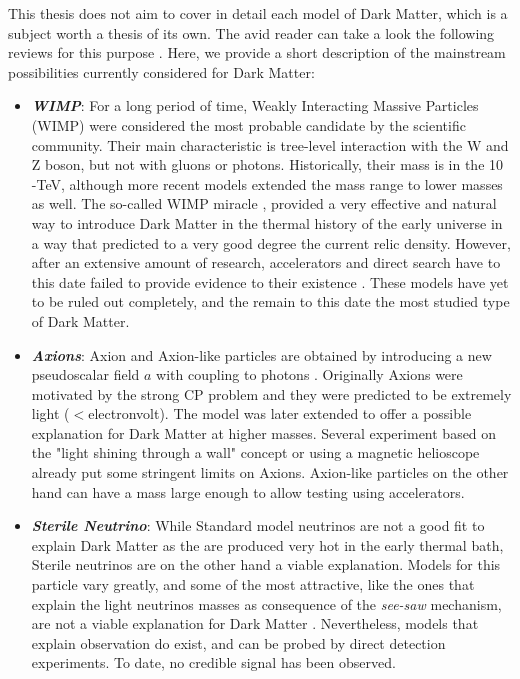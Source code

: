 This thesis does not aim to cover in detail each model of Dark Matter, which is a subject worth a thesis of its own. The avid reader can take a look the following reviews for this purpose \cite{battaglieri2017cosmic,Profumo:2019ujg,HAMBYE2020135553,alex2016dark,review-particle-physics,Feng:2010gw}. Here, we provide a short description of the mainstream possibilities currently considered for Dark Matter:
\begin{itemize}
\item \textbf{\textit{WIMP}}: For a long period of time, Weakly Interacting Massive Particles (WIMP) were considered the most probable candidate by the scientific community. Their main characteristic is tree-level interaction with the W and Z boson, but not with gluons or photons. Historically, their mass is in the 10 \gev-\si{\tera\electronvolt}, although more recent models extended the mass range to lower masses as well. The so-called WIMP miracle \cite{Chang:2013oia}, provided a very effective and natural way to introduce Dark Matter in the thermal history of the early universe in a way that predicted to a very good degree the current relic density. However, after an extensive amount of research, accelerators and direct search have to this date failed to provide evidence to their existence \cite{Arcadi:2017kky}. These models have yet to be ruled out completely, and the remain to this date the most studied type of Dark Matter.
\item \textbf{\textit{Axions}}: Axion and Axion-like particles are obtained by introducing a new pseudoscalar field $a$ with coupling to photons \cite{Marsh:2015xka}. Originally Axions were motivated by the strong CP problem and they were predicted to be extremely light ($<$\si{electronvolt}). The model was later extended to offer a possible explanation for Dark Matter at higher masses. Several experiment based on the "light shining through a wall" concept or using a magnetic helioscope \cite{annurev.nucl.56.080805.140513} already put some stringent limits on Axions. Axion-like particles on the other hand can have a mass large enough to allow testing using accelerators.
\item \textbf{\textit{Sterile Neutrino}}: While Standard model neutrinos are not a good fit to explain Dark Matter as the are produced very hot in the early thermal bath, Sterile neutrinos are on the other hand a viable explanation. Models for this particle vary greatly, and some of the most attractive, like the ones that explain the light neutrinos masses as consequence of the \textit{see-saw} mechanism, are not a viable explanation for Dark Matter \cite{Feng:2010gw}. Nevertheless, models that explain observation do exist, and can be probed by direct detection experiments. To date, no credible signal has been observed.

\end{itemize}
